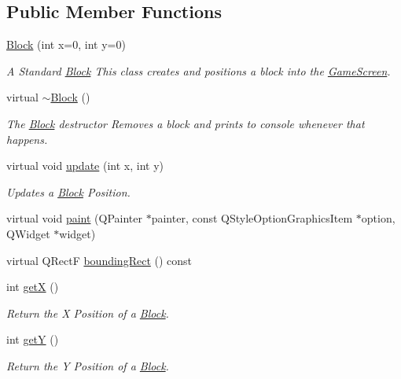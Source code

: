 \subsection*{Public Member Functions}
\begin{DoxyCompactItemize}
\item 
\hyperlink{class_block_aada344df339d2124eeaa726367ae27fe}{Block} (int x=0, int y=0)
\begin{DoxyCompactList}\small\item\em A Standard \hyperlink{class_block}{Block} This class creates and positions a block into the \hyperlink{class_game_screen}{Game\-Screen}. \end{DoxyCompactList}\item 
virtual \hyperlink{class_block_a19d1bd0e1cef6a865ed2745a2e648405}{$\sim$\-Block} ()
\begin{DoxyCompactList}\small\item\em The \hyperlink{class_block}{Block} destructor Removes a block and prints to console whenever that happens. \end{DoxyCompactList}\item 
virtual void \hyperlink{class_block_aa374e103c2ba9e060c4689f4da21a9ff}{update} (int x, int y)
\begin{DoxyCompactList}\small\item\em Updates a \hyperlink{class_block}{Block} Position. \end{DoxyCompactList}\item 
virtual void \hyperlink{class_block_a8f526f6d76bf11afae85d8b23239cce2}{paint} (Q\-Painter $\ast$painter, const Q\-Style\-Option\-Graphics\-Item $\ast$option, Q\-Widget $\ast$widget)
\item 
virtual Q\-Rect\-F \hyperlink{class_block_aee4444b92a82f5a8080e9019ef1e554d}{bounding\-Rect} () const 
\item 
int \hyperlink{class_block_a527c8f990b4b99dda6f4ca225ee32c14}{get\-X} ()
\begin{DoxyCompactList}\small\item\em Return the X Position of a \hyperlink{class_block}{Block}. \end{DoxyCompactList}\item 
int \hyperlink{class_block_a2501c303a7975db005ddc49d9551a51b}{get\-Y} ()
\begin{DoxyCompactList}\small\item\em Return the Y Position of a \hyperlink{class_block}{Block}. \end{DoxyCompactList}\item 

\end{DoxyCompactItemize}

